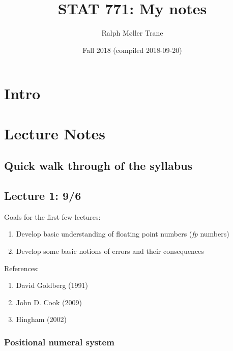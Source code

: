 \documentclass[]{book}
\title{STAT 771: My notes}
\author{Ralph Møller Trane}
\date{Fall 2018 (compiled 2018-09-20)}
\providecommand{\tightlist}{%
  \setlength{\itemsep}{0pt}\setlength{\parskip}{0pt}}
\theoremstyle{definition}
\theoremstyle{definition}
\theoremstyle{definition}
\theoremstyle{remark}
\begin{document}
\maketitle

{
\setcounter{tocdepth}{1}
\tableofcontents
}
\newcommand{\R}{\mathbb{R}}
\newcommand{\N}{\mathbb{N}}

\newcommand{\norm}[1]{\left \vert \left \vert #1 \right \vert \right \vert}

\newcommand{\argmin}{\text{argmin}}
\newcommand{\argmax}{\text{argmax}}

\chapter{Intro}\label{intro}

\chapter{Lecture Notes}\label{lecture-notes}

\section{Quick walk through of the
syllabus}\label{quick-walk-through-of-the-syllabus}

\section{Lecture 1: 9/6}\label{lecture-1-96}

Goals for the first few lectures:

\begin{enumerate}
\def\labelenumi{\arabic{enumi}.}
\tightlist
\item
  Develop basic understanding of floating point numbers (\emph{fp}
  numbers)
\item
  Develop some basic notions of errors and their consequences
\end{enumerate}

References:

\begin{enumerate}
\def\labelenumi{\roman{enumi}.}
\tightlist
\item
  David Goldberg (1991)
\item
  John D. Cook (2009)
\item
  Hingham (2002)
\end{enumerate}

\subsection{Positional numeral system}\label{positional-numeral-system}
\end{document}
